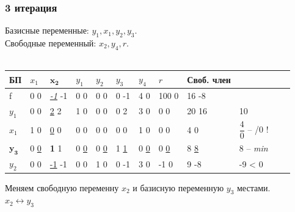 \documentclass[14pt,a4paper,fleqn]{extarticle}
\begin{document}
\subsubsection*{3 итерация}
Базисные переменные: $y_1, x_1, y_2, y_3$.\\
Свободные переменный: $x_2, y_4, r$.\\\\
\begin{tabularx}{\textwidth}{|p{1cm}|p{1cm}V{7}p{1cm}V{6}p{1cm}|p{1cm}|p{1cm}|p{1cm}|p{1cm}|p{1.2cm}|c}
	\hline
	БП & $x_1$ & $\boldsymbol{x_2}$ & $y_1$ & $y_2$ & $y_3$ & $y_4$ & $r$ & Своб. член & \\
	\hline
	
	f & 0 \scriptsize 0 & \underline{\textit{-1}} \scriptsize -1 & 0 \scriptsize 0 & 0 \scriptsize 0 & 0 \scriptsize -1 & 4 \scriptsize 0 & 100 \scriptsize 0 & 16 \scriptsize -8 & \\
	
	\hline
	
	$y_1$ & 0 \scriptsize 0 & \underline{2} \scriptsize 2 & 1 \scriptsize 0 & 0 \scriptsize 0 & 0 \scriptsize 2 & 3 \scriptsize 0 & 0 \scriptsize 0 & 20 \scriptsize 16 & 10 \\
	
	\hline
	
	$x_1$ & 1 \scriptsize 0 & \underline{0} \scriptsize 0 & 0 \scriptsize 0 & 0 \scriptsize 0 & 0 \scriptsize 0 & 1 \scriptsize 0 & 0 \scriptsize 0 & 4 \scriptsize 0 & $\dfrac{4}{0}$ -- /0 ! \\
	
	\Xhline{6\arrayrulewidth}
	$\boldsymbol{y_3}$ & 0 \scriptsize \underline 0 & \textbf{1} \scriptsize 1 & 0 \scriptsize \underline 0 & 0 \scriptsize \underline 0 & 1 \scriptsize \underline 1 & 0 \scriptsize \underline 0 & 0 \scriptsize \underline 0 & 8 \scriptsize \underline 8 & 8 -- \textit{min} \\
	\Xhline{6\arrayrulewidth}
	
	$y_2$ & 0 \scriptsize 0 & \underline{-1} \scriptsize -1 & 0 \scriptsize 0 & 1 \scriptsize 0 & 0 \scriptsize -1 & 3 \scriptsize 0 & -1 \scriptsize 0 & 9 \scriptsize -8 & -9 < 0 \\
	\hline
\end{tabularx}
\newline\newline
Меняем свободную переменну $x_2$ и базисную переменную $y_3$ местами.\\
$x_2 \leftrightarrow y_3$
\end{document}
